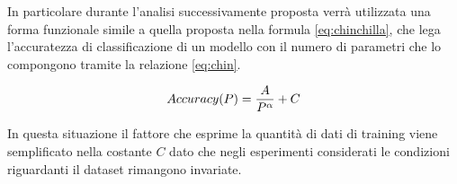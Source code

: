 In particolare durante l'analisi successivamente proposta verrà utilizzata una forma funzionale simile a quella proposta nella formula \ref{eq:chinchilla}, che lega l'accuratezza di classificazione di un modello con il numero di parametri che lo compongono tramite la relazione \ref{eq:chin}.

\begin{equation}
\label{eq:chin}
    \centering
    Accuracy(P) = \frac{A}{P^{\alpha}} + C
\end{equation}

In questa situazione il fattore che esprime la quantità di dati di training viene semplificato nella costante $C$ dato che negli esperimenti considerati le condizioni riguardanti il dataset rimangono invariate.







